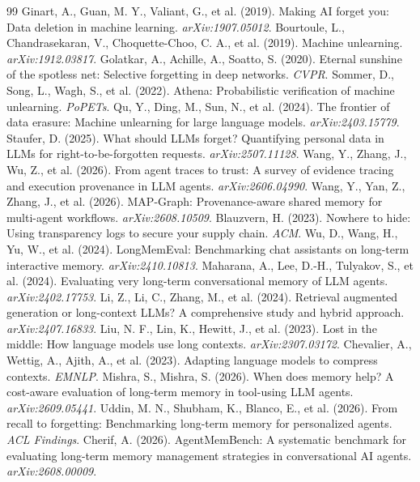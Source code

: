 \documentclass[11pt]{article}
\begin{document}
\begin{thebibliography}{99}
 Ginart, A., Guan, M. Y., Valiant, G., et al. (2019). Making AI forget you: Data deletion in machine learning. \emph{arXiv:1907.05012}.
 Bourtoule, L., Chandrasekaran, V., Choquette-Choo, C. A., et al. (2019). Machine unlearning. \emph{arXiv:1912.03817}.
 Golatkar, A., Achille, A., Soatto, S. (2020). Eternal sunshine of the spotless net: Selective forgetting in deep networks. \emph{CVPR}.
 Sommer, D., Song, L., Wagh, S., et al. (2022). Athena: Probabilistic verification of machine unlearning. \emph{PoPETs}.
 Qu, Y., Ding, M., Sun, N., et al. (2024). The frontier of data erasure: Machine unlearning for large language models. \emph{arXiv:2403.15779}.
 Staufer, D. (2025). What should LLMs forget? Quantifying personal data in LLMs for right-to-be-forgotten requests. \emph{arXiv:2507.11128}.
 Wang, Y., Zhang, J., Wu, Z., et al. (2026). From agent traces to trust: A survey of evidence tracing and execution provenance in LLM agents. \emph{arXiv:2606.04990}.
 Wang, Y., Yan, Z., Zhang, J., et al. (2026). MAP-Graph: Provenance-aware shared memory for multi-agent workflows. \emph{arXiv:2608.10509}.
 Blauzvern, H. (2023). Nowhere to hide: Using transparency logs to secure your supply chain. \emph{ACM}.
 Wu, D., Wang, H., Yu, W., et al. (2024). LongMemEval: Benchmarking chat assistants on long-term interactive memory. \emph{arXiv:2410.10813}.
 Maharana, A., Lee, D.-H., Tulyakov, S., et al. (2024). Evaluating very long-term conversational memory of LLM agents. \emph{arXiv:2402.17753}.
 Li, Z., Li, C., Zhang, M., et al. (2024). Retrieval augmented generation or long-context LLMs? A comprehensive study and hybrid approach. \emph{arXiv:2407.16833}.
 Liu, N. F., Lin, K., Hewitt, J., et al. (2023). Lost in the middle: How language models use long contexts. \emph{arXiv:2307.03172}.
 Chevalier, A., Wettig, A., Ajith, A., et al. (2023). Adapting language models to compress contexts. \emph{EMNLP}.
 Mishra, S., Mishra, S. (2026). When does memory help? A cost-aware evaluation of long-term memory in tool-using LLM agents. \emph{arXiv:2609.05441}.
 Uddin, M. N., Shubham, K., Blanco, E., et al. (2026). From recall to forgetting: Benchmarking long-term memory for personalized agents. \emph{ACL Findings}.
 Cherif, A. (2026). AgentMemBench: A systematic benchmark for evaluating long-term memory management strategies in conversational AI agents. \emph{arXiv:2608.00009}.
\end{thebibliography}
\end{document}
